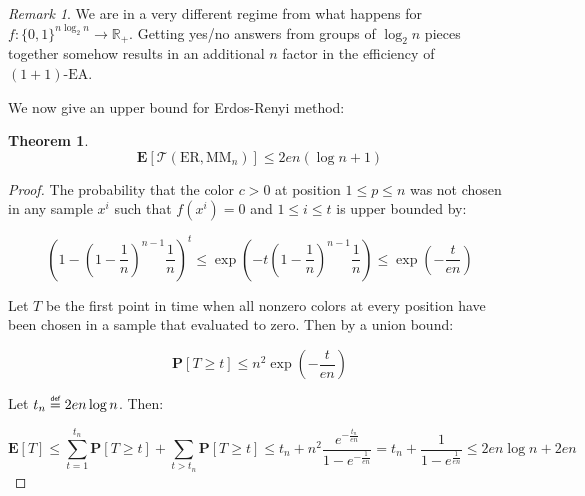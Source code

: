 \documentclass[12pt]{article}
\theoremstyle{definition}
\theoremstyle{plain}
\newtheorem*{theorem}{Theorem}
\theoremstyle{remark}
\newtheorem*{remark}{Remark}
\newcommand\mydef{\mathrel{\overset{\makebox[0pt]{\mbox{\normalfont\tiny\sffamily def}}}{=}}}
\begin{document}
\begin{remark}
    We are in a very different regime from what happens for $f:\{0,1\}^{n \log_2 n}\to \mathbb{R}_+$. Getting yes/no
    answers from groups of $\log_2 n$ pieces together somehow results in an additional $n$ factor in the efficiency of $(1+1)\text{-EA}$.
\end{remark}

We now give an upper bound for Erdos-Renyi method:

\begin{theorem}
    $$\mathbf{E}[\mathcal{T}(\text{ER}, \text{MM}_n)]\le 2en(\log n+1)$$
\end{theorem}

\begin{proof}
    The probability that the color $c>0$ at position $1\le p\le n$
    was not chosen in any sample $x^i$ such that $f(x^i)=0$ and $1\le i\le t$
    is upper bounded by:

    $$\left(1-\left(1-\frac{1}{n}\right)^{n-1}\frac{1}{n}\right)^t\le \exp\left(-t\left(1-\frac{1}{n}\right)^{n-1}\frac{1}{n}\right)\le\exp\left(-\frac{t}{en}\right)$$

    Let $T$ be the first point in time when all nonzero colors at every position have
    been chosen in a sample that evaluated to zero. Then by a union bound:

    $$\mathbf{P}[T\ge t]\le n^2 \exp\left(-\frac{t}{en}\right)$$

    Let $t_n\mydef 2en\log n$. Then:

    $$\mathbf{E}[T]\le \sum_{t=1}^{t_n} \mathbf{P}[T\ge t] +\sum_{t>t_n} \mathbf{P}[T\ge t]
    \le t_n+n^2 \frac{e^{-\frac{t_n}{en}}}{1-e^{-\frac{1}{en}}}= t_n+\frac{1}{1-e^{\frac{1}{en}}}\le 2en\log n+2en$$

\end{proof}
\end{document}
